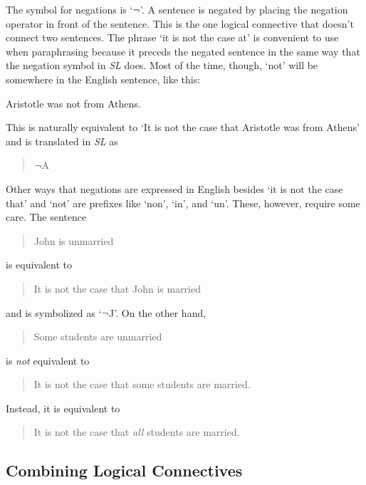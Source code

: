 \documentclass[../logic-text.tex]{subfiles}
\begin{document}
The symbol for negations is \enquote*{\(\neg\)}. A sentence is negated by placing the negation operator in front of the sentence. This is the one logical connective that doesn't connect two sentences. The phrase \enquote*{it is not the case at} is convenient to use when paraphrasing because it preceds the negated sentence in the same way that the negation symbol in \emph{SL} does. Most of the time, though, \enquote*{not} will be somewhere in the English sentence, like this:

Aristotle was not from Athens.

This is naturally equivalent to \enquote*{It is not the case that Aristotle was from Athens} and is translated in \emph{SL} as



\begin{quote}
  \(\neg\)A
\end{quote}

Other ways that negations are expressed in English besides \enquote*{it is not the case that} and \enquote*{not} are prefixes like \enquote*{non}, \enquote*{in}, and \enquote*{un}. These, however, require some care. The sentence


\begin{quote}
  John is unmarried
\end{quote}

\noindent is equivalent to

\begin{quote}
  It is not the case that John is married
\end{quote}

\noindent and is symbolized as \enquote*{\(\neg\)J}.
On the other hand,

\begin{quote}
  Some students are unmarried
\end{quote}

\noindent is \emph{not} equivalent to

\begin{quote}
  It is not the case that some students are married.
\end{quote}

\noindent Instead, it is equivalent to

\begin{quote}
  It is not the case that \emph{all} students are married.
\end{quote}


\subsection{Combining Logical Connectives}
\label{sec:comb-logic-conn}
\end{document}
